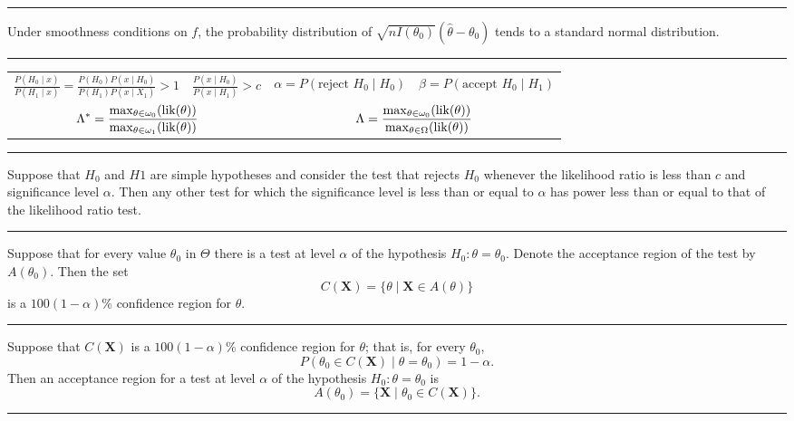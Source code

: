 \documentclass{article}
\begin{document}
\hrule
Under smoothness conditions on $f$, the probability distribution of $\sqrt{n I(\theta_0)}(\hat{\theta} - \theta_0)$ tends to a standard normal distribution.
\hrule

\begin{tabular}{|cccc|}
\hline
$\frac{P(H_0 \mid x)}{P(H_1 \mid x)} = \frac{P(H_0) P(x \mid H_0)}{P(H_1) P(x \mid X_1)} > 1$
& $\frac{P(x \mid H_0)}{P(x \mid H_1)} > c$
& $\alpha = P(\text{reject } H_0 \mid H_0)$
& $\beta = P(\text{accept } H_0 \mid H_1)$\\

\multicolumn{2}{|c}{
$\displaystyle{\Lambda^* = \frac{\max_{\theta \in \omega_0}(\textup{lik}(\theta))}{\max_{\theta \in \omega_1}(\textup{lik}(\theta))}}$}
& \multicolumn{2}{c|}{
$\displaystyle{\Lambda = \frac{\max_{\theta \in \omega_0}(\textup{lik}(\theta))}{\max_{\theta \in \Omega}(\textup{lik}(\theta))}}$}\\
\hline
\end{tabular}

\hrule
Suppose that $H_0$ and $H1$ are simple hypotheses and consider the test that rejects $H_0$ whenever the likelihood ratio is less than $c$ and significance level $\alpha$. Then any other test for which the significance level is less than or equal to $\alpha$ has power less than or equal to that of the likelihood ratio test.
\hrule

Suppose that for every value $\theta_0$ in $\Theta$ there is a test at level $\alpha$ of the hypothesis $H_0 : \theta = \theta_0$. Denote the acceptance region of the test by $A(\theta_0)$. Then the set
\[
C(\mathbf{X}) = \{\theta \mid \mathbf{X} \in A(\theta)\}
\]
is a $100(1-\alpha)\%$ confidence region for $\theta$.
\hrule

Suppose that $C(\mathbf{X})$ is a $100(1-\alpha)\%$ confidence region for $\theta$; that is, for every $\theta_0$,
\[
P(\theta_0 \in C(\mathbf{X}) \mid \theta = \theta_0) = 1 - \alpha.
\]
Then an acceptance region for a test at level $\alpha$ of the hypothesis $H_0 : \theta = \theta_0$ is
\[
A(\theta_0) = \{\mathbf{X} \mid \theta_0 \in C(\mathbf{X})\}.
\]
\hrule
\end{document}

